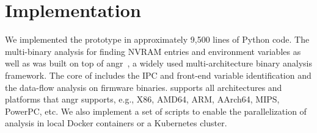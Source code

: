 \section{Implementation}
\label{sec:implementation}

We implemented the \mango prototype in approximately 9,500 lines of Python code.
The multi-binary analysis for finding NVRAM entries and environment variables as well as \rda was built on top of angr~\cite{shoshitaishvili2016sok}, a widely used multi-architecture binary analysis framework.
The core of \mango includes the IPC and front-end variable identification and the data-flow analysis on firmware binaries.
\mango supports all architectures and platforms that angr supports, e.g., X86, AMD64, ARM, AArch64, MIPS, PowerPC, etc.
We also implement a set of scripts to enable the parallelization of \mango analysis in local Docker containers or a Kubernetes cluster.
